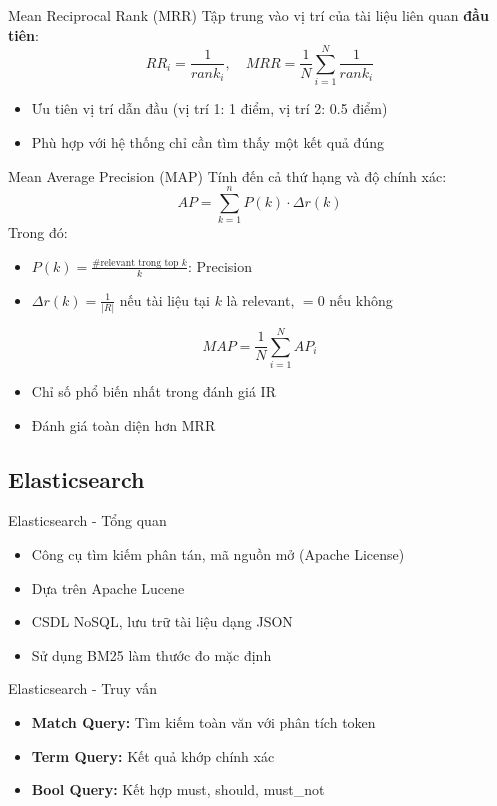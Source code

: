 \documentclass[serif, aspectratio=169]{beamer}
\begin{document}
\begin{frame}{Mean Reciprocal Rank (MRR)}
Tập trung vào vị trí của tài liệu liên quan \textbf{đầu tiên}:
\[
RR_i = \frac{1}{rank_i}, \quad MRR = \frac{1}{N} \sum_{i=1}^{N} \frac{1}{rank_i}
\]
\begin{itemize}
    \item Ưu tiên vị trí dẫn đầu (vị trí 1: 1 điểm, vị trí 2: 0.5 điểm)
    \item Phù hợp với hệ thống chỉ cần tìm thấy một kết quả đúng
\end{itemize}
\end{frame}

\begin{frame}{Mean Average Precision (MAP)}
Tính đến cả thứ hạng và độ chính xác:
\[
AP = \sum_{k=1}^{n} P(k) \cdot \Delta r(k)
\]
Trong đó:
\begin{itemize}
    \item $P(k) = \frac{\#\text{relevant trong top }k}{k}$: Precision\@k
    \item $\Delta r(k) = \frac{1}{|R|}$ nếu tài liệu tại $k$ là relevant, $=0$ nếu không
\end{itemize}
\[
MAP = \frac{1}{N} \sum_{i=1}^{N} AP_i
\]
\begin{itemize}
    \item Chỉ số phổ biến nhất trong đánh giá IR
    \item Đánh giá toàn diện hơn MRR
\end{itemize}
\end{frame}

\subsection{Elasticsearch}
\begin{frame}{Elasticsearch - Tổng quan}
\begin{itemize}
    \item Công cụ tìm kiếm phân tán, mã nguồn mở (Apache License)
    \item Dựa trên Apache Lucene
    \item CSDL NoSQL, lưu trữ tài liệu dạng JSON
    \item Sử dụng BM25 làm thước đo mặc định
\end{itemize}
\end{frame}


\begin{frame}{Elasticsearch - Truy vấn}
\begin{itemize}
    \item \textbf{Match Query:} Tìm kiếm toàn văn với phân tích token
    \item \textbf{Term Query:} Kết quả khớp chính xác
    \item \textbf{Bool Query:} Kết hợp must, should, must\_not
\end{itemize}
\end{frame}
\end{document}
